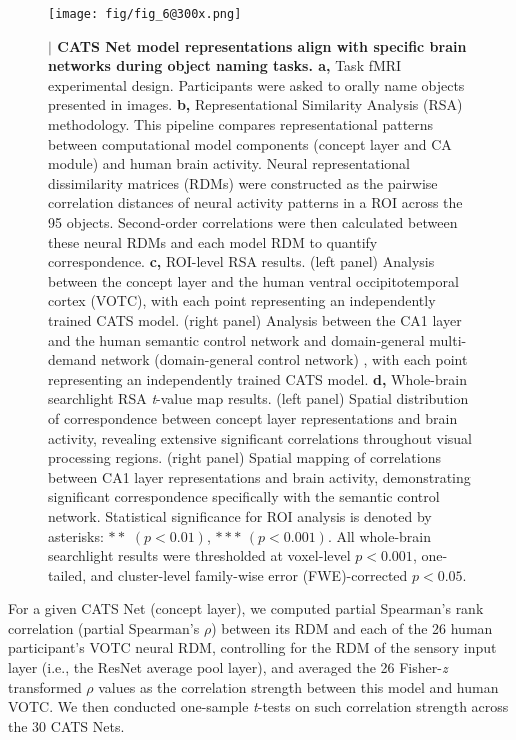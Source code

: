 \documentclass[pdflatex,sn-mathphys-num,lineno]{sn-jnl}%
\begin{document}
\begin{CJK}{UTF8}{gbsn}
\begin{figure}[htbp]
\centering
\texttt{[image: fig/fig\_6@300x.png]}
\caption{\textbf{$\vert$ CATS Net model representations align with specific brain networks during object naming tasks. a,} Task fMRI experimental design. Participants were asked to orally name objects presented in images. \textbf{b,} Representational Similarity Analysis (RSA) methodology. This pipeline compares representational patterns between computational model components (concept layer and CA module) and human brain activity. Neural representational dissimilarity matrices (RDMs) were constructed as the pairwise correlation distances of neural activity patterns in a ROI across the 95 objects. Second-order correlations were then calculated between these neural RDMs and each model RDM to quantify correspondence. \textbf{c,} ROI-level RSA results. (left panel) Analysis between the concept layer and the human ventral occipitotemporal cortex (VOTC), with each point representing an independently trained CATS model. (right panel) Analysis between the CA1 layer and the human semantic control network \cite{jackson_neural_2021} and domain-general multi-demand network (domain-general control network) \cite{fedorenko_broad_2013}, with each point representing an independently trained CATS model. \textbf{d,} Whole-brain searchlight RSA \textit{t}-value map results. (left panel) Spatial distribution of correspondence between concept layer representations and brain activity, revealing extensive significant correlations throughout visual processing regions. (right panel) Spatial mapping of correlations between CA1 layer representations and brain activity, demonstrating significant correspondence specifically with the semantic control network. Statistical significance for ROI analysis is denoted by asterisks: $**$ $(p < 0.01)$, $***$ $(p < 0.001)$. All whole-brain searchlight results were thresholded at voxel-level $p < 0.001$, one-tailed, and cluster-level family-wise error (FWE)-corrected $p < 0.05$.}
\label{fig6}
\end{figure}

For a given CATS Net (concept layer), we computed partial Spearman’s rank correlation (partial Spearman’s $\rho$) between its RDM and each of the 26 human participant’s VOTC neural RDM, controlling for the RDM of the sensory input layer (i.e., the ResNet average pool layer), and averaged the 26 Fisher-\textit{z} transformed $\rho$ values as the correlation strength between this model and human VOTC. We then conducted one-sample \textit{t}-tests on such correlation strength across the 30 CATS Nets.


\end{CJK}
\end{document}

